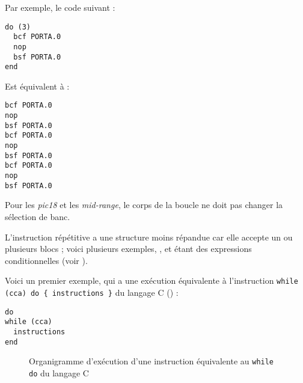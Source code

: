Par exemple, le code suivant :
\begin{lstlisting}[language=piccolo]
do (3)
  bcf PORTA.0
  nop
  bsf PORTA.0
end
\end{lstlisting}

Est équivalent à :
\begin{lstlisting}[language=piccolo]
bcf PORTA.0
nop
bsf PORTA.0
bcf PORTA.0
nop
bsf PORTA.0
bcf PORTA.0
nop
bsf PORTA.0
\end{lstlisting}


Pour les \emph{pic18} et les \emph{mid-range}, le corps de la boucle ne doit pas changer la sélection de banc.










L'instruction répétitive a une structure moins répandue car elle accepte un ou plusieurs blocs  ; voici plusieurs exemples, ,  et  étant des expressions conditionnelles (voir ).


Voici un premier exemple, qui a une exécution équivalente à l'instruction \texttt{while (cca) do \{ instructions \}} du langage C () :
\begin{lstlisting}[language=piccolo]
do
while (cca)
  instructions
end
\end{lstlisting}

\begin{figure}[!ht]
  \centering
  \small
  \caption{Organigramme d'exécution d'une instruction équivalente au  \texttt{while} \texttt{do} du langage C}
  \dotfill
\end{figure}

